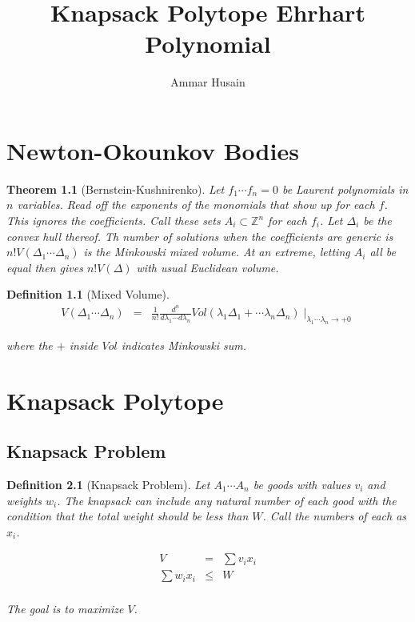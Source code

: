 \documentclass[11pt]{book}
\title{Knapsack Polytope Ehrhart Polynomial}
\author{Ammar Husain}
\theoremstyle{change}
\newtheorem{definition}[equation]{Definition}
\newtheorem{thm}[equation]{Theorem}
\theoremstyle{nonumberplain}
\numberwithin{equation}{section}
\begin{document}
\chapter{Newton-Okounkov Bodies}

\begin{thm}[Bernstein-Kushnirenko]
Let $f_1 \cdots f_n = 0$ be Laurent polynomials in $n$ variables. Read off the exponents of the monomials that show up for each $f$. This ignores the coefficients. Call these sets $A_i \subset \mathbb{Z}^n$ for each $f_i$. Let $\Delta_i$ be the convex hull thereof. Th number of solutions when the coefficients are generic is $n! V(\Delta_1 \cdots \Delta_n)$ is the Minkowski mixed volume. At an extreme, letting $A_i$ all be equal then gives $n! V(\Delta)$ with usual Euclidean volume.
\end{thm}

\begin{definition}[Mixed Volume]
\begin{eqnarray*}
V( \Delta_1 \cdots \Delta_n ) &=& \frac{1}{n!} \frac{d^n}{d\lambda_1 \cdots d\lambda_n} Vol ( \lambda_1 \Delta_1 + \cdots \lambda_n \Delta_n ) \mid_{\lambda_1 \cdots \lambda_n \to +0}
\end{eqnarray*}

where the $+$ inside $Vol$ indicates Minkowski sum.

\end{definition}

\chapter{Knapsack Polytope}

\section{Knapsack Problem}

\begin{definition}[Knapsack Problem]
Let $A_1 \cdots A_n$ be goods with values $v_i$ and weights $w_i$. The knapsack can include any natural number of each good with the condition that the total weight should be less than $W$. Call the numbers of each as $x_i$.

\begin{eqnarray*}
V &=& \sum v_i x_i\\
\sum w_i x_i &\leq& W\\
\end{eqnarray*}

The goal is to maximize $V$.

\end{definition}
\end{document}
